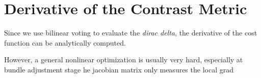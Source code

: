 \chapter{Derivative of the Contrast Metric}\label{sec:jacobian}
Since we use bilinear voting to evaluate the \textit{dirac delta}, the
derivative of the cost function can be analytically computed.

However, a general nonlinear optimization is usually very hard,
especially at bundle adjustment stage he jacobian matrix only measures
the local grad
